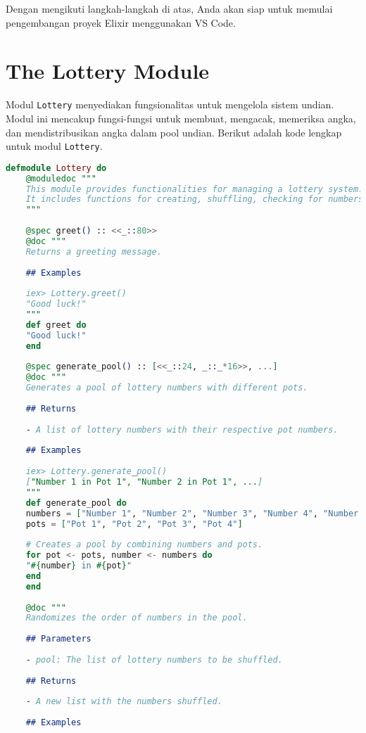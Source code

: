 Dengan mengikuti langkah-langkah di atas, Anda akan siap untuk memulai pengembangan proyek Elixir menggunakan VS Code.


\section{The Lottery Module}

Modul \texttt{Lottery} menyediakan fungsionalitas untuk mengelola sistem undian. Modul ini mencakup fungsi-fungsi untuk membuat, mengacak, memeriksa angka, dan mendistribusikan angka dalam pool undian. Berikut adalah kode lengkap untuk modul \texttt{Lottery}.

\begin{lstlisting}[language=elixir, caption={Complete Lottery Module}]
	defmodule Lottery do
	@moduledoc """
	This module provides functionalities for managing a lottery system.
	It includes functions for creating, shuffling, checking for numbers, and distributing numbers within the lottery pool.
	"""
	
	@spec greet() :: <<_::80>>
	@doc """
	Returns a greeting message.
	
	## Examples
	
	iex> Lottery.greet()
	"Good luck!"
	"""
	def greet do
	"Good luck!"
	end
	
	@spec generate_pool() :: [<<_::24, _::_*16>>, ...]
	@doc """
	Generates a pool of lottery numbers with different pots.
	
	## Returns
	
	- A list of lottery numbers with their respective pot numbers.
	
	## Examples
	
	iex> Lottery.generate_pool()
	["Number 1 in Pot 1", "Number 2 in Pot 1", ...]
	"""
	def generate_pool do
	numbers = ["Number 1", "Number 2", "Number 3", "Number 4", "Number 5", "Number 6"]
	pots = ["Pot 1", "Pot 2", "Pot 3", "Pot 4"]
	
	# Creates a pool by combining numbers and pots.
	for pot <- pots, number <- numbers do
	"#{number} in #{pot}"
	end
	end
	
	@doc """
	Randomizes the order of numbers in the pool.
	
	## Parameters
	
	- pool: The list of lottery numbers to be shuffled.
	
	## Returns
	
	- A new list with the numbers shuffled.
	
	## Examples
	

\end{lstlisting}

